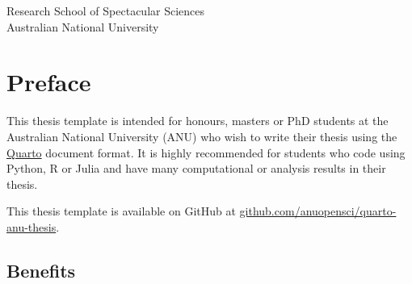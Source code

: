 \documentclass[
  a4paper,
  oneside,
  openany,
  12pt,
  onecolumn]{book}
\renewcommand*\contentsname{Table of contents}
\newcommand\contentsname{Table of contents}
\theoremstyle{plain}
\theoremstyle{definition}
\theoremstyle{remark}
\begin{document}
\begin{frontmatter}
\begin{titlepage}
\begin{titlepage}
  \noindent Research School of Spectacular Sciences\\
  \noindent Australian National University

  \end{titlepage}
  \setlength{\parindent}{0pt}
  \setlength{\parskip}{1ex plus 0.5ex minus 0.2ex}








  \end{titlepage}
  \end{frontmatter}


\renewcommand*\contentsname{Table of contents}
{
\setcounter{tocdepth}{2}
\tableofcontents
}
\listoffigures
{}
\listoftables
{}
\mainmatter
{}

\chapter*{Preface}\label{preface}


This thesis template is intended for honours, masters or PhD students at
the Australian National University (ANU) who wish to write their thesis
using the \href{https://quarto.org/}{Quarto} document format. It is
highly recommended for students who code using Python, R or Julia and
have many computational or analysis results in their thesis.

\begin{tcolorbox}[enhanced jigsaw, colbacktitle=quarto-callout-note-color!10!white, opacityback=0, coltitle=black, leftrule=.75mm, rightrule=.15mm, opacitybacktitle=0.6, bottomtitle=1mm, left=2mm, titlerule=0mm, title=\textcolor{quarto-callout-note-color}{\faInfo}\hspace{0.5em}{Note}, breakable, arc=.35mm, colback=white, colframe=quarto-callout-note-color-frame, bottomrule=.15mm, toptitle=1mm, toprule=.15mm]

This thesis template is available on GitHub at
\href{https://github.com/anuopensci/quarto-anu-thesis}{github.com/anuopensci/quarto-anu-thesis}.

\end{tcolorbox}

\section*{Benefits}\label{benefits}
\end{document}
